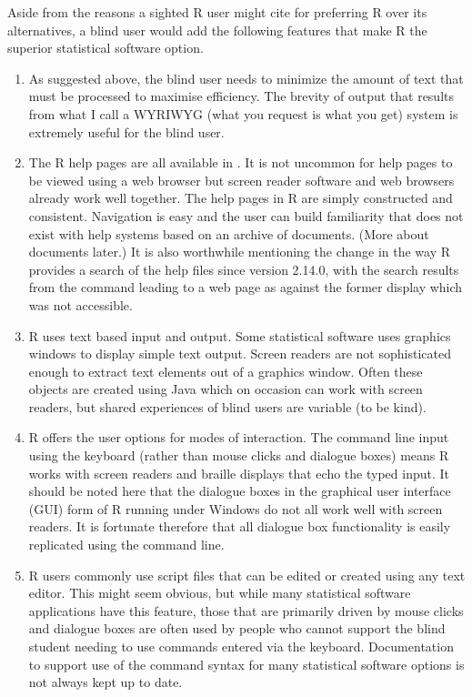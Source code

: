 Aside from the reasons a sighted R user might cite for preferring R over its alternatives, a blind user would add  the following features that make R the superior statistical software option.

\begin{enumerate}
\item As suggested above, the blind user needs to minimize the amount of text that must be processed to maximise efficiency. The brevity of output that results from what I call a WYRIWYG (what you request is what you get) system is extremely useful for the blind user.

\item The R help pages are all available in \html. It is not uncommon for help pages to be viewed using a web browser but screen reader software and web browsers already work well together. The help pages in R are simply constructed and consistent. Navigation is easy and the user can build familiarity that does not exist with help systems based on an archive of \pdf{} documents. (More about \pdf{} documents later.) It is also worthwhile mentioning the change in the way R provides a search of the help files since version 2.14.0, with the search results from the  command leading to a web page as against the former display which was not accessible.

\item R uses text based input and output. Some statistical software uses graphics windows to display simple text output. Screen readers are not sophisticated enough to extract text elements out of a graphics window. Often these objects are created using Java which on occasion can work with screen readers, but shared experiences of blind users are variable (to be kind).

\item R offers the user options for  modes of interaction. The command line input using the keyboard (rather than mouse clicks and dialogue boxes) means R works with screen readers and braille displays that echo the typed input. It should be noted here that the dialogue boxes in the graphical user interface (GUI) form of R running under Windows do not all work well with screen readers. It is fortunate therefore that all dialogue box functionality is easily replicated using the command line. 

\item R users commonly   use script files that can be edited or created using any text editor. This might seem obvious, but while many statistical software applications have this feature, those that are primarily driven by mouse  clicks and dialogue boxes are often used by people who cannot support the blind student needing to use commands entered via the keyboard. Documentation to support use of the command syntax for many statistical software options is not always kept up to date.



\end{enumerate}
